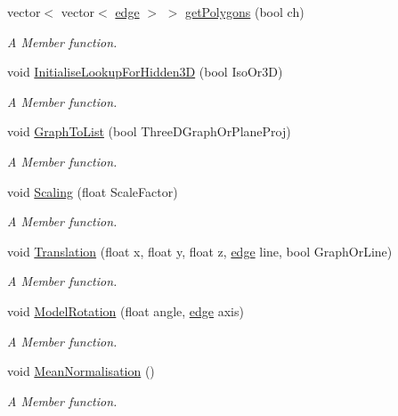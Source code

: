 \begin{DoxyCompactItemize}
\item 
vector$<$ vector$<$ \hyperlink{structedge}{edge} $>$ $>$ \hyperlink{classThreeDGraph__class_a6bc32a5861610e120135f76383cbc8aa}{get\+Polygons} (bool ch)
\begin{DoxyCompactList}\small\item\em A Member function. \end{DoxyCompactList}\item 
void \hyperlink{classThreeDGraph__class_a132845f27333d0c2ead3a27bb4398a4d}{Initialise\+Lookup\+For\+Hidden3D} (bool Iso\+Or3D)
\begin{DoxyCompactList}\small\item\em A Member function. \end{DoxyCompactList}\item 
void \hyperlink{classThreeDGraph__class_a521cb31c72fa3828840a3bf4403e1395}{Graph\+To\+List} (bool Three\+D\+Graph\+Or\+Plane\+Proj)
\begin{DoxyCompactList}\small\item\em A Member function. \end{DoxyCompactList}\item 
void \hyperlink{classThreeDGraph__class_afa131e00002ddff96be961a903e2c589}{Scaling} (float Scale\+Factor)
\begin{DoxyCompactList}\small\item\em A Member function. \end{DoxyCompactList}\item 
void \hyperlink{classThreeDGraph__class_aa3f177ba316ff1fc411926ba9d08c80f}{Translation} (float x, float y, float z, \hyperlink{structedge}{edge} line, bool Graph\+Or\+Line)
\begin{DoxyCompactList}\small\item\em A Member function. \end{DoxyCompactList}\item 
void \hyperlink{classThreeDGraph__class_a400bececda29db8682455d92872f0a5e}{Model\+Rotation} (float angle, \hyperlink{structedge}{edge} axis)
\begin{DoxyCompactList}\small\item\em A Member function. \end{DoxyCompactList}\item 
void \hyperlink{classThreeDGraph__class_ad30f5f058cfe9a0de8a91dd062fb10c5}{Mean\+Normalisation} ()
\begin{DoxyCompactList}\small\item\em A Member function. \end{DoxyCompactList}\item 

\end{DoxyCompactItemize}
